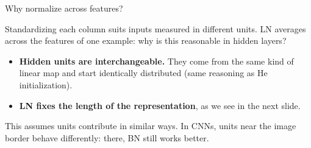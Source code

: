 \documentclass[11pt,aspectratio=169]{beamer}
\begin{document}
\begin{frame}{Why normalize across features?}
    \setlength{\parskip}{3pt}

    Standardizing each column suits inputs measured in different units. LN
    averages across the features of one example: why is this reasonable in
    hidden layers?
    \begin{itemize}\small
        \item \textbf{Hidden units are interchangeable.} They come from the same
              kind of linear map and start identically distributed (same reasoning as He initialization).
        \item \textbf{LN fixes the length of the representation}, as we see
              in the next slide.
    \end{itemize}

    \vspace{0.5em}
    \begin{tcolorbox}[nndsorange]
        This assumes units contribute in similar ways. In CNNs, units near the
        image border behave differently: there, BN still works better.
    \end{tcolorbox}


\end{frame}
\end{document}
